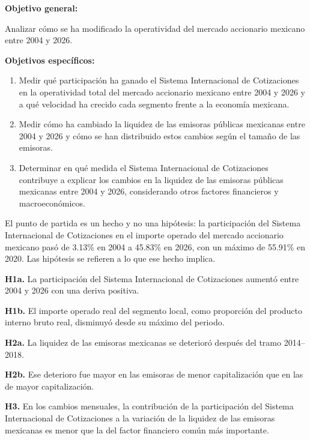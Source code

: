 
\textbf{Objetivo general:}

Analizar cómo se ha modificado la operatividad del mercado accionario mexicano entre 2004 y 2026.

\textbf{Objetivos específicos:}

\begin{enumerate}
\def\labelenumi{\arabic{enumi}.}
\item
  Medir qué participación ha ganado el Sistema Internacional de Cotizaciones en la operatividad total del mercado accionario mexicano entre 2004 y 2026 y a qué velocidad ha crecido cada segmento frente a la economía mexicana.
\item
  Medir cómo ha cambiado la liquidez de las emisoras públicas mexicanas entre 2004 y 2026 y cómo se han distribuido estos cambios según el tamaño de las emisoras.
\item
  Determinar en qué medida el Sistema Internacional de Cotizaciones contribuye a explicar los cambios en la liquidez de las emisoras públicas mexicanas entre 2004 y 2026, considerando otros factores financieros y macroeconómicos.
\end{enumerate}


El punto de partida es un hecho y no una hipótesis: la participación del Sistema Internacional de Cotizaciones en el importe operado del mercado accionario mexicano pasó de 3.13\% en 2004 a 45.83\% en 2026, con un máximo de 55.91\% en 2020. Las hipótesis se refieren a lo que ese hecho implica.

\textbf{H1a.} La participación del Sistema Internacional de Cotizaciones aumentó entre 2004 y 2026 con una deriva positiva.

\textbf{H1b.} El importe operado real del segmento local, como proporción del producto interno bruto real, disminuyó desde su máximo del periodo.

\textbf{H2a.} La liquidez de las emisoras mexicanas se deterioró después del tramo 2014--2018.

\textbf{H2b.} Ese deterioro fue mayor en las emisoras de menor capitalización que en las de mayor capitalización.

\textbf{H3.} En los cambios mensuales, la contribución de la participación del Sistema Internacional de Cotizaciones a la variación de la liquidez de las emisoras mexicanas es menor que la del factor financiero común más importante.

